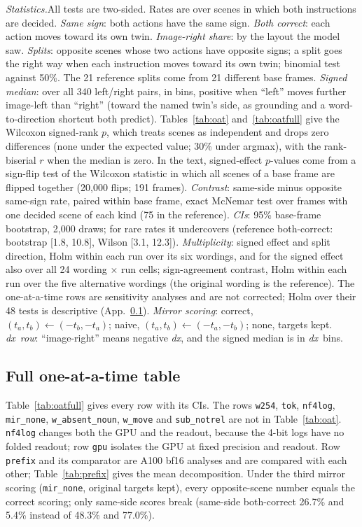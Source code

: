 \documentclass[conference]{IEEEtran}
\newcommand{\dx}{\textit{dx}}
\newcommand{\rowid}[1]{\texttt{#1}}
\newcommand{\head}[1]{\textit{#1}\hspace{0.4em}}
\begin{document}
\head{Statistics.}All tests are two-sided. Rates are over scenes in which both instructions are decided. \emph{Same sign}: both actions have the same sign. \emph{Both correct}: each action moves toward its own twin. \emph{Image-right share}: by the layout the model saw. \emph{Splits}: opposite scenes whose two actions have opposite signs; a split goes the right way when each instruction moves toward its own twin; binomial test against 50\%. The 21 reference splits come from 21 different base frames. \emph{Signed median}: over all 340 left/right pairs, in bins, positive when ``left'' moves further image-left than ``right'' (toward the named twin's side, as grounding and a word-to-direction shortcut both predict). Tables~\ref{tab:oat} and~\ref{tab:oatfull} give the Wilcoxon signed-rank $p$, which treats scenes as independent and drops zero differences (none under the expected value; 30\% under argmax), with the rank-biserial $r$ when the median is zero. In the text, signed-effect $p$-values come from a sign-flip test of the Wilcoxon statistic in which all scenes of a base frame are flipped together (20,000 flips; 191 frames). \emph{Contrast}: same-side minus opposite same-sign rate, paired within base frame, exact McNemar test over frames with one decided scene of each kind (75 in the reference). \emph{CIs}: 95\% base-frame bootstrap, 2,000 draws; for rare rates it undercovers (reference both-correct: bootstrap [1.8, 10.8], Wilson [3.1, 12.3]). \emph{Multiplicity}: signed effect and split direction, Holm within each run over its six wordings, and for the signed effect also over all 24 wording $\times$ run cells; sign-agreement contrast, Holm within each run over the five alternative wordings (the original wording is the reference). The one-at-a-time rows are sensitivity analyses and are not corrected; Holm over their 48 tests is descriptive (App.~\ref{app:oat}). \emph{Mirror scoring}: correct, $(t_a,t_b)\leftarrow(-t_b,-t_a)$; naive, $(t_a,t_b)\leftarrow(-t_a,-t_b)$; none, targets kept. \emph{\dx\ row}: ``image-right'' means negative \dx, and the signed median is in \dx\ bins.

\subsection{Full one-at-a-time table}
\label{app:oat}

Table~\ref{tab:oatfull} gives every row with its CIs. The rows \rowid{w254}, \rowid{tok}, \rowid{nf4log}, \rowid{mir\_none}, \rowid{w\_absent\_noun}, \rowid{w\_move} and \rowid{sub\_notrel} are not in Table~\ref{tab:oat}. \rowid{nf4log} changes both the GPU and the readout, because the 4-bit logs have no folded readout; row \rowid{gpu} isolates the GPU at fixed precision and readout. Row \rowid{prefix} and its comparator are A100 bf16 analyses and are compared with each other; Table~\ref{tab:prefix} gives the mean decomposition. Under the third mirror scoring (\rowid{mir\_none}, original targets kept), every opposite-scene number equals the correct scoring; only same-side scores break (same-side both-correct 26.7\% and 5.4\% instead of 48.3\% and 77.0\%).
\end{document}
